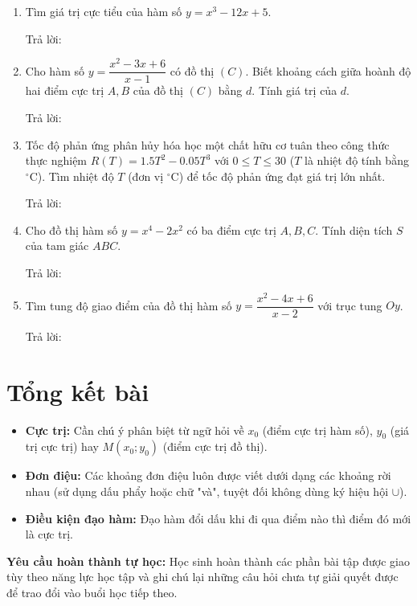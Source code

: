\documentclass[12pt]{article}
\newcommand{\otraloi}{\underline{\hspace{5cm}}}
\begin{document}
\begin{enumerate}[label=\textbf{Câu \arabic*.}]
		\item Tìm giá trị cực tiểu của hàm số $y = x^3 - 12x + 5$.
		\par Trả lời: \otraloi
		
		\item Cho hàm số $y = \dfrac{x^2 - 3x + 6}{x - 1}$ có đồ thị $(C)$. Biết khoảng cách giữa hoành độ hai điểm cực trị $A, B$ của đồ thị $(C)$ bằng $d$. Tính giá trị của $d$.
		\par Trả lời: \otraloi
		
		\item Tốc độ phản ứng phân hủy hóa học một chất hữu cơ tuân theo công thức thực nghiệm $R(T) = 1.5T^2 - 0.05T^3$ với $0 \le T \le 30$ ($T$ là nhiệt độ tính bằng $^\circ\text{C}$). Tìm nhiệt độ $T$ (đơn vị $^\circ\text{C}$) để tốc độ phản ứng đạt giá trị lớn nhất.
		\par Trả lời: \otraloi
		
		\item Cho đồ thị hàm số $y = x^4 - 2x^2$ có ba điểm cực trị $A, B, C$. Tính diện tích $S$ của tam giác $ABC$.
		\par Trả lời: \otraloi
		
		\item Tìm tung độ giao điểm của đồ thị hàm số $y = \dfrac{x^2 - 4x + 6}{x - 2}$ với trục tung $Oy$.
		\par Trả lời: \otraloi
		
	\end{enumerate}
	
	\newpage
	
	\section{Tổng kết bài}
	
	\begin{tcolorbox}[colback=yellow!10!white, colframe=orange!60!black,
		fonttitle=\bfseries, title={Tóm tắt sơ đồ tư duy \& Các lỗi thường gặp}]
		\begin{itemize}
			\item \textbf{Cực trị:} Cần chú ý phân biệt từ ngữ hỏi về $x_0$ (điểm cực trị hàm số), $y_0$ (giá trị cực trị) hay $M(x_0; y_0)$ (điểm cực trị đồ thị).
			\item \textbf{Đơn điệu:} Các khoảng đơn điệu luôn được viết dưới dạng các khoảng rời nhau (sử dụng dấu phẩy hoặc chữ "và", tuyệt đối không dùng ký hiệu hội $\cup$).
			\item \textbf{Điều kiện đạo hàm:} Đạo hàm đổi dấu khi đi qua điểm nào thì điểm đó mới là cực trị.
		\end{itemize}
	\end{tcolorbox}
	
	\vspace{3mm}
	\textbf{Yêu cầu hoàn thành tự học:} Học sinh hoàn thành các phần bài tập được giao tùy theo năng lực học tập và ghi chú lại những câu hỏi chưa tự giải quyết được để trao đổi vào buổi học tiếp theo.
	
\end{document}
